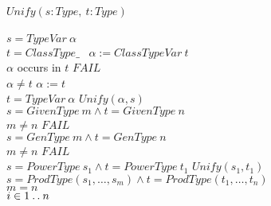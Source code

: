 \begin{algorithmic}[1]
\STATE $Unify(s : Type,~t : Type)$\\
\STATE \nexti\TBEGIN\\
\STATE \nexti\nexti\TIF $s = TypeVar~\alpha$ \TTHEN\label{alg:start-variable-types}\\
\STATE \nexti\nexti\nexti\TIF $t = ClassType \mathrel{\_}$~  \TTHEN $\alpha :=
ClassTypeVar~t$\label{alg:empty-class-type}\\
\STATE \nexti\nexti\nexti\TELSE\TIF $\alpha$ occurs in $t$ \TTHEN $FAIL$\\
\STATE \nexti\nexti\nexti\TELSE\TIF $\alpha \neq t$ \TTHEN $\alpha := t$\\
\STATE \nexti\nexti\TELSE\TIF $t = TypeVar~\alpha$ \TTHEN $Unify(\alpha, s)$\label{alg:end-variable-types}\\
\STATE \nexti\nexti\TELSE\TIF $s = GivenType~ m \land t = GivenType~n$ \TTHEN\\
\STATE \nexti\nexti\nexti\TIF $m \neq n$ \TTHEN $FAIL$\\
\STATE \nexti\nexti\TELSE\TIF $s = GenType~ m \land t = GenType~n$ \TTHEN\\
\STATE \nexti\nexti\nexti\TIF $m \neq n$ \TTHEN $FAIL$\\
\STATE \nexti\nexti\TELSE\TIF $s = PowerType~s_1 \land t = PowerType~t_1$ \TTHEN $Unify(s_1, t_1)$\\
\STATE \nexti\nexti\TELSE\TIF $s = ProdType(s_1, \ldots, s_m) \land t = ProdType(t_1, \ldots, t_n)$ \TTHEN\\
\STATE \nexti\nexti\nexti\TIF $m = n$ \TTHEN\\
\STATE \nexti\nexti\nexti\nexti\TFOR $i \in 1 \mathbin{\mathstrut{\ldotp\ldotp}} n$ \TDO

\end{algorithmic}
